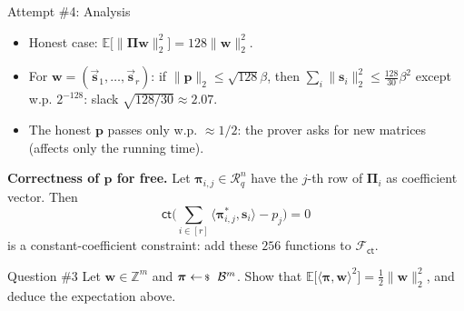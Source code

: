 \documentclass{zkdl-presentation-template}
\begin{document}
    \begin{frame}{Attempt \#4: Analysis}
        \begin{itemize}
            \item Honest case: $\mathbb{E}\big[\|\boldsymbol{\Pi}\mathbf{w}\|_2^2\big] = 128\|\mathbf{w}\|_2^2$.\pause
            \item For $\mathbf{w} = (\vec{\mathbf{s}}_1,\dots,\vec{\mathbf{s}}_r)$: if $\|\mathbf{p}\|_2 \leq \sqrt{128}\beta$, then $\sum_i\|\mathbf{s}_i\|_2^2 \leq \frac{128}{30}\beta^2$ except w.p. $2^{-128}$: slack $\sqrt{128/30} \approx 2.07$.\pause
            \item The honest $\mathbf{p}$ passes only w.p. $\approx 1/2$: the prover asks for new matrices (affects only the running time).
        \end{itemize}
        \pause

        \textbf{Correctness of $\mathbf{p}$ for free.} Let $\boldsymbol{\pi}_{i,j} \in \mathcal{R}_q^n$ have the $j$-th row of $\boldsymbol{\Pi}_i$ as coefficient vector. Then
        \begin{equation*}
            \mathsf{ct}\Big(\sum_{i \in [r]} \big\langle \boldsymbol{\pi}_{i,j}^{\ast}, \mathbf{s}_i \big\rangle - p_j\Big) = 0
        \end{equation*}
        is a constant-coefficient constraint: add these $256$ functions to $\mathcal{F}_{\mathsf{ct}}$.
        \pause

        \begin{questionblock}{Question \#3}
            Let $\mathbf{w} \in \mathbb{Z}^m$ and $\boldsymbol{\pi} \leftarrowS \mathcal{B}^m$. Show that $\mathbb{E}\big[\langle \boldsymbol{\pi}, \mathbf{w} \rangle^2\big] = \frac{1}{2}\|\mathbf{w}\|_2^2$, and deduce the expectation above.
        \end{questionblock}
    \end{frame}
\end{document}
